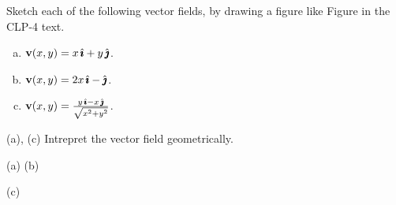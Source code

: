 \begin{question}\label{prb sketch vf}
Sketch each of the following vector fields, by
drawing a figure like Figure  
in the CLP-4 text.
\begin{enumerate}[(a)]
\item
   $\mathbf{v}(x,y) = x\,\hat{\pmb{\imath}}+y\,\hat{\pmb{\jmath}}$.
\item
   $\mathbf{v}(x,y) = 2x\,\hat{\pmb{\imath}} -\hat{\pmb{\jmath}}$.
\item
   $\mathbf{v}(x,y) = \frac{y\,\hat{\pmb{\imath}} -x\,\hat{\pmb{\jmath}}}{\sqrt{x^2+y^2}}$.
\end{enumerate}
\end{question}

\begin{hint}
(a), (c) Intrepret the vector field geometrically. 
\end{hint}

\begin{answer} 
\begin{center}
      (a) \qquad
      (b) 
\end{center}
\begin{center}
      (c) 
\end{center}
\end{answer}

